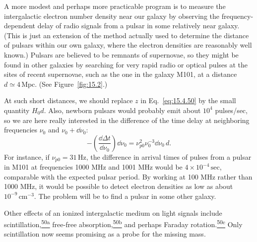 A more modest and perhaps more practicable program is to measure the
intergalactic electron number density near our galaxy by observing the
frequency-dependent delay of radio signals from a pulsar in some relatively
near galaxy. (This is just an extension of the method actually used to
determine the distance of pulsars within our own galaxy, where the electron
densities are reasonably well known.) Pulsars are believed to be remnants of
supernovae, so they might be found in other galaxies by searching for very
rapid radio or optical pulses at the sites of recent supernovae, such as the
one in the galaxy M101, at a distance \(d\simeq4\,\mathrm{Mpc}\). (See
Figure~\ref{fig:15.2}.)



At such short distances, we should replace \(z\) in Eq.~\eqref{eq:15.4.50}
by the small quantity \(H_0d\). Also, newborn pulsars would probably emit
about \(10^4\) pulses/sec, so we are here really interested in the difference
of the time delay at neighboring frequencies \(\nu_0\) and
\(\nu_0+\dd\nu_0\):
\[
  -\left(\frac{\dd\Delta t}{\dd\nu_0}\right)\dd\nu_0
  =
  \nu_{p0}^2\nu_0^{-3}\dd\nu_0\,d.
\]
For instance, if \(\nu_{p0}=31\,\mathrm{Hz}\), the difference in arrival
times of pulses from a pulsar in M101 at frequencies 1000 MHz and 1001 MHz
would be \(4\times10^{-4}\,\mathrm{sec}\), comparable with the expected
pulsar period. By working at 100 MHz rather than 1000 MHz, it would be
possible to detect electron densities as low as about
\(10^{-9}\,\mathrm{cm^{-3}}\). The problem will be to find a pulsar in some
other galaxy.

Other effects of an ionized intergalactic medium on light signals include
scintillation,\hyperref[ch15-ref-50a]{\textsuperscript{50a}} free-free
absorption,\hyperref[ch15-ref-50b]{\textsuperscript{50b}} and perhaps Faraday
rotation.\hyperref[ch15-ref-50c]{\textsuperscript{50c}} Only scintillation
now seems promising as a probe for the missing mass.
